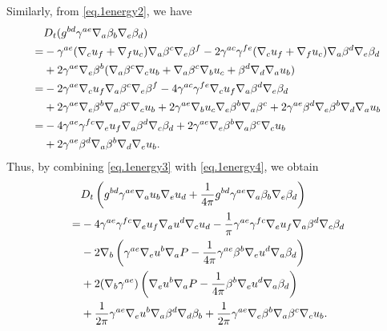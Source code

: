 \documentclass[12pt,reqno]{amsart}
\numberwithin{equation}{section}
\theoremstyle{definition}
\theoremstyle{remark}
\begin{document}
Similarly, from \eqref{eq.1energy2}, we have
\begin{align}\label{eq.1energy4}
  &D_t(g^{bd}\gamma^{ae}{\nabla}_a \beta_b{\nabla}_e \beta_d){\nonumber}\\
  =& -\gamma^{ae}({\nabla}_cu_f+{\nabla}_fu_c){\nabla}_a \beta^c{\nabla}_e \beta^f -2\gamma^{ac}\gamma^{fe}({\nabla}_cu_f+{\nabla}_fu_c){\nabla}_a \beta^d{\nabla}_e \beta_d{\nonumber}\\
  &+2\gamma^{ae}{\nabla}_e\beta^b({\nabla}_a\beta^c{\nabla}_c u_b+{\nabla}_a\beta^c{\nabla}_b u_c+\beta^d{\nabla}_d{\nabla}_a u_b){\nonumber}\\
  =&-2\gamma^{ae}{\nabla}_cu_f{\nabla}_a \beta^c{\nabla}_e \beta^f-4\gamma^{ac}\gamma^{fe}{\nabla}_cu_f{\nabla}_a \beta^d{\nabla}_e \beta_d{\nonumber}\\
  &+2\gamma^{ae}{\nabla}_e\beta^b{\nabla}_a\beta^c{\nabla}_c u_b+2\gamma^{ae}{\nabla}_b u_c{\nabla}_e\beta^b{\nabla}_a\beta^c+2\gamma^{ae}\beta^d{\nabla}_e\beta^b{\nabla}_d{\nabla}_a u_b{\nonumber}\\
  =&-4\gamma^{ae}\gamma^{fc}{\nabla}_eu_f{\nabla}_a \beta^d{\nabla}_c \beta_d+2\gamma^{ae}{\nabla}_e\beta^b{\nabla}_a\beta^c{\nabla}_c u_b{\nonumber}\\
  &+2\gamma^{ae}\beta^d{\nabla}_a\beta^b{\nabla}_d{\nabla}_e u_b.
\end{align}
Thus, by combining \eqref{eq.1energy3} with \eqref{eq.1energy4}, we obtain
\begin{align}\label{eq.1energy1.u}
  &D_t\left(g^{bd}\gamma^{ae}{\nabla}_a u_b{\nabla}_e u_d+\frac{1}{4\pi}g^{bd}\gamma^{ae}{\nabla}_a \beta_b{\nabla}_e \beta_d\right){\nonumber}\\
  =&-4\gamma^{ae}\gamma^{fc}{\nabla}_eu_f{\nabla}_a u^d{\nabla}_c u_d -\frac{1}{\pi}\gamma^{ae}\gamma^{fc}{\nabla}_eu_f{\nabla}_a \beta^d{\nabla}_c \beta_d {\nonumber}\\
  &-2{\nabla}_b\left(\gamma^{ae}{\nabla}_e u^b{\nabla}_a{P } -\frac{1}{4\pi}\gamma^{ae}\beta^b{\nabla}_e u^d{\nabla}_a\beta_d\right){\nonumber}\\
  &+2({\nabla}_b\gamma^{ae})\left({\nabla}_e u^b{\nabla}_a{P } -\frac{1}{4\pi}\beta^b{\nabla}_e u^d{\nabla}_a\beta_d\right){\nonumber}\\
  &+\frac{1}{2\pi}\gamma^{ae}{\nabla}_e u^b{\nabla}_a\beta^d {\nabla}_d\beta_b+\frac{1}{2\pi}\gamma^{ae}{\nabla}_e\beta^b{\nabla}_a\beta^c{\nabla}_c u_b.
\end{align}
\end{document}
